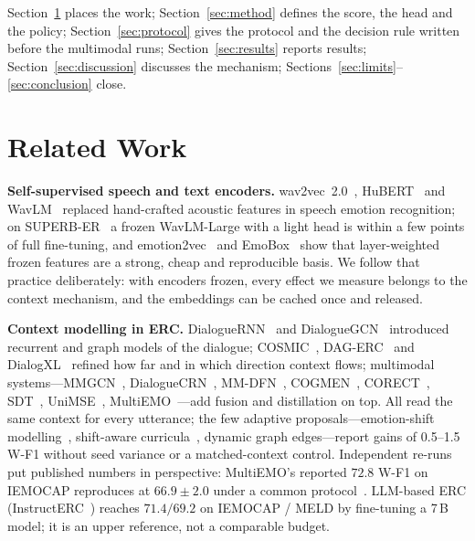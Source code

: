 \documentclass[journal]{IEEEtran}
\newcommand{\wf}{W-F1}
\begin{document}
Section~\ref{sec:related} places the work; Section~\ref{sec:method} defines the score, the head and the policy; Section~\ref{sec:protocol} gives the protocol and the decision rule written before the multimodal runs; Section~\ref{sec:results} reports results; Section~\ref{sec:discussion} discusses the mechanism; Sections~\ref{sec:limits}--\ref{sec:conclusion} close.

\section{Related Work}\label{sec:related}
\textbf{Self-supervised speech and text encoders.} wav2vec~2.0~\cite{baevski2020wav2vec}, HuBERT~\cite{hsu2021hubert} and WavLM~\cite{chen2022wavlm} replaced hand-crafted acoustic features in speech emotion recognition; on SUPERB-ER~\cite{yang2021superb} a frozen WavLM-Large with a light head is within a few points of full fine-tuning, and emotion2vec~\cite{ma2024emotion2vec} and EmoBox~\cite{ma2024emobox} show that layer-weighted frozen features are a strong, cheap and reproducible basis. We follow that practice deliberately: with encoders frozen, every effect we measure belongs to the context mechanism, and the embeddings can be cached once and released.

\textbf{Context modelling in ERC.} DialogueRNN~\cite{majumder2019dialoguernn} and DialogueGCN~\cite{ghosal2019dialoguegcn} introduced recurrent and graph models of the dialogue; COSMIC~\cite{ghosal2020cosmic}, DAG-ERC~\cite{shen2021dagerc} and DialogXL~\cite{shen2021dialogxl} refined how far and in which direction context flows; multimodal systems---MMGCN~\cite{hu2021mmgcn}, DialogueCRN~\cite{hu2021dialoguecrn}, MM-DFN~\cite{hu2022mmdfn}, COGMEN~\cite{joshi2022cogmen}, CORECT~\cite{nguyen2023corect}, SDT~\cite{ma2024sdt}, UniMSE~\cite{hu2022unimse}, MultiEMO~\cite{shi2023multiemo}---add fusion and distillation on top. All read the same context for every utterance; the few adaptive proposals---emotion-shift modelling~\cite{bansal2022shapes}, shift-aware curricula~\cite{yang2022hybrid}, dynamic graph edges---report gains of 0.5--1.5 \wf{} without seed variance or a matched-context control. Independent re-runs put published numbers in perspective: MultiEMO's reported $72.8$ \wf{} on IEMOCAP reproduces at $66.9 \pm 2.0$ under a common protocol~\cite{dutta2026mister}. LLM-based ERC (InstructERC~\cite{lei2023instructerc}) reaches $71.4 / 69.2$ on IEMOCAP / MELD by fine-tuning a 7\,B model; it is an upper reference, not a comparable budget.
\end{document}
